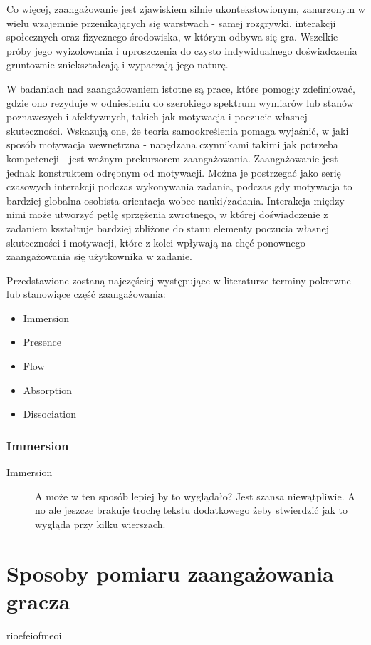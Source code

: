 Co więcej, zaangażowanie jest zjawiskiem silnie ukontekstowionym, zanurzonym w wielu wzajemnie
przenikających się warstwach - samej rozgrywki, interakcji społecznych oraz fizycznego środowiska, w
którym odbywa się gra. Wszelkie próby jego wyizolowania i uproszczenia do czysto indywidualnego
doświadczenia gruntownie zniekształcają i wypaczają jego naturę.

W badaniach nad zaangażowaniem istotne są prace, które pomogły zdefiniować, gdzie ono rezyduje w
odniesieniu do szerokiego spektrum wymiarów lub stanów poznawczych i afektywnych, takich jak motywacja
i poczucie własnej skuteczności. Wskazują one, że teoria samookreślenia pomaga wyjaśnić, w jaki
sposób motywacja wewnętrzna - napędzana czynnikami takimi jak potrzeba kompetencji - jest ważnym
prekursorem zaangażowania. Zaangażowanie jest jednak konstruktem odrębnym od motywacji\cite{measuring_engagement}. Można je
postrzegać jako serię czasowych interakcji podczas wykonywania zadania, podczas gdy motywacja to
bardziej globalna osobista orientacja wobec nauki/zadania. Interakcja między nimi może utworzyć pętlę
sprzężenia zwrotnego, w której doświadczenie z zadaniem kształtuje bardziej zbliżone do stanu elementy
poczucia własnej skuteczności i motywacji, które z kolei wpływają na chęć ponownego zaangażowania się
użytkownika w zadanie\cite{measuring_engagement}.

Przedstawione zostaną najczęściej występujące w literaturze terminy pokrewne lub stanowiące część
zaangażowania:

\begin{itemize}
    \item Immersion
    \item Presence
    \item Flow
    \item Absorption
    \item Dissociation
\end{itemize}

\subsubsection*{Immersion}

\lipsum[1]

\begin{description}
    \item[Immersion] A może w ten sposób lepiej by to wyglądało? Jest szansa niewątpliwie. A no ale
          jeszcze brakuje trochę tekstu dodatkowego żeby stwierdzić jak to wygląda przy kilku wierszach.
\end{description}

\section{Sposoby pomiaru zaangażowania gracza}\label{section:ch3_2}

rioefeiofmeoi